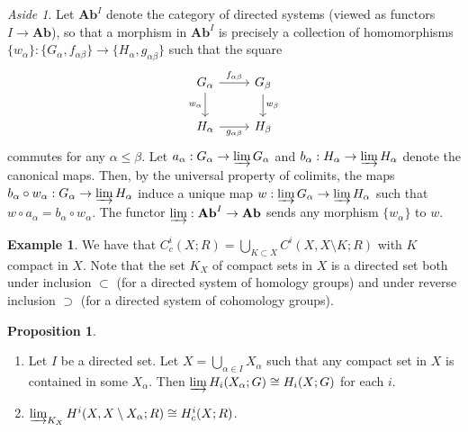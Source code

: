 \documentclass[10pt,letterpaper,cm]{nupset}
\theoremstyle{definition}
\newtheorem{exmp}[definition]{Example}
\theoremstyle{theorem}
\newtheorem{prop}[definition]{Proposition}
\theoremstyle{remark}
\newtheorem*{aside}{Aside}
\newcommand{\1}{\mathbb{1}}
\newcommand{\0}{\vec 0}
\begin{document}
\begin{aside}
Let $\mathbf{Ab}^I$ denote the category of directed systems (viewed as functors $I \to \mathbf{Ab}$), so that a morphism in $\mathbf{Ab}^I$ is precisely a collection of homomorphisms $\{w_{\alpha}\}: \{G_{\alpha}, f_{\alpha{\beta}}\} \to \{H_{\alpha}, g_{\alpha{\beta}}\}$ such that the square 
\[ \begin{tikzcd}
G_{\alpha} \arrow[d, "w_{\alpha}"'] \arrow[r, "f_{\alpha{\beta}}"] & G_{\beta} \arrow[d, "w_{\beta}"] \\
H_{\alpha} \arrow[r, "g_{\alpha{\beta}}"']                         & H_{\beta}                       
\end{tikzcd}
\] commutes for any $\alpha \leq \beta$. Let $a_{\alpha} : G_{\alpha} \to \varinjlim G_{\alpha}$ and $b_{\alpha} : H_{\alpha} \to \varinjlim H_{\alpha}$ denote the canonical maps. Then, by the universal property of colimits, the maps $b_{\alpha} \circ w_{\alpha} : G_{\alpha} \to  \varinjlim H_{\alpha}$ induce a unique map $w:  \varinjlim G_{\alpha} \to  \varinjlim H_{\alpha}$ such that $w \circ a_{\alpha} = b_{\alpha} \circ w_{\alpha}$.
The functor $\varinjlim : \mathbf{Ab}^I \to \mathbf{Ab}$ sends any morphism $\{w_{\alpha}\}$ to $w$.
\end{aside}

\begin{exmp}
We have that $C_c^i(X; R) = \bigcup_{K \subset X} C^i(X, X \setminus K; R)$ with  $K$ compact in $X$. Note that the set $K_X$ of compact sets in $X$ is a directed set both under inclusion $\subset$ (for a directed system of homology groups) and under reverse inclusion $\supset$ (for a directed system of cohomology groups). 
\end{exmp}

\begin{prop}\label{prop25} $ $
\begin{enumerate} 
\item Let $I$ be a directed set. Let $X= \bigcup_{\alpha \in I}X_{\alpha}$ such that any compact set in $X$ is contained in some $X_{\alpha}$. Then $\varinjlim H_i(X_{\alpha}; G) \cong H_i(X; G)$ for each $i$.
\item $\varinjlim_{K_X} H^i(X, X \setminus X_{\alpha}; R) \cong H^i_c(X; R)$.
\end{enumerate}
\end{prop}
\end{document}
